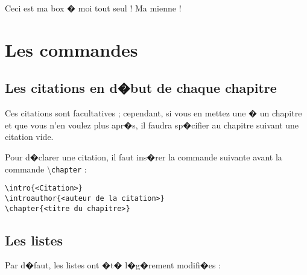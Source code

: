 \documentclass[ams,openany,10pt,presentation,latin1]{mathbook}
\begin{document}
\begin{mybox}
Ceci est ma box � moi tout seul !
\breakbox
Ma mienne !
\end{mybox}

\section{Les commandes}

\subsection{Les citations en d�but de chaque chapitre}

Ces citations sont facultatives ; cependant, si vous en mettez une � un chapitre et que vous n'en voulez plus apr�s, il faudra sp�cifier au chapitre suivant une citation vide.

\medskip

Pour d�clarer une citation, il faut ins�rer la commande suivante avant la commande \textbackslash\texttt{chapter} :

\medskip

\begin{lstlisting}
\intro{<Citation>}
\introauthor{<auteur de la citation>}
\chapter{<titre du chapitre>}
\end{lstlisting}

\subsection{Les listes}

Par d�faut, les listes ont �t� l�g�rement modifi�es :

\medskip
\end{document}
